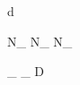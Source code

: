 
\newmathsymbol{\tagdecision}     {d}
\newmathsymbol{\mistagestimate}  {\eta}
\newmathsymbol{\mistag}          {\omega}

\newmathsymbol{\NRtagged}        {N_}
\newmathsymbol{\NWtagged}        {N_}
\newmathsymbol{\NUtagged}        {N_}

\newmathsymbol{\tageff}          {\epsilon_}
\newmathsymbol{\efftageff}       {\epsilon_}
\newmathsymbol{\tagdilution}     {D}
